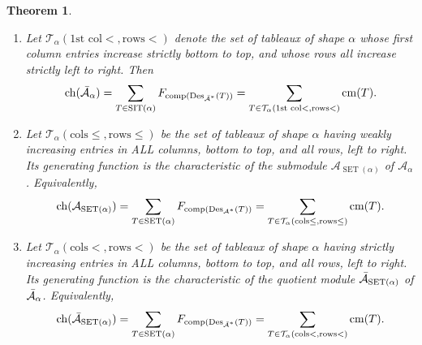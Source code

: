 \documentclass[12pt,letterpaper]{amsart}
\newcommand{\sheilaFeb}{\textcolor{black}}  \newcommand{\sheilaFebAgain}{\textcolor{magenta}}  \newcommand{\emn}{\textcolor{blue}}
\newtheorem{theorem}{Theorem}[section]
\theoremstyle{definition}
\DeclareMathOperator{\comp}{comp}
\DeclareMathOperator{\Des}{Des}
\newcommand{\SET}{\ensuremath{\operatorname{SET}}} \newcommand{\NSET}{\ensuremath{\operatorname{NSET}}}\newcommand{\SRCT}{\ensuremath{\operatorname{SRCT}}}
\begin{document}
{\begin{theorem}
\begin{enumerate}
\begin{equation*}\label{eqn:gf-A}
\sheilaFeb{\chr({\mathcal{A}_\alpha}) =\sum_{T\in \SIT(\alpha)} F_{\comp(\Des_{\mathcal{A}^*}(T))}=\sum_{T\in  \mathcal{T}_\alpha({\text{1st col}\le, \text{rows}\le})}  \mathrm{cm}(T)}.
\end{equation*}
\item Let $\mathcal{T}_\alpha({\text{1st col}<, \text{rows}<})$ denote the set of tableaux of shape $\alpha$ whose first column entries increase strictly bottom to top, and whose rows all increase strictly left to right. Then
\begin{equation*}\label{eqn:gf-barA}
\sheilaFeb{\chr(\bA_\alpha) =\sum_{T\in \SIT(\alpha)} F_{\comp(\Des_{\bA^*}(T))}=\sum_{T\in  \mathcal{T}_\alpha({\text{1st col}<, \text{rows}<})}  \mathrm{cm}(T)}.
\end{equation*}
\item Let $\mathcal{T}_\alpha({\text{cols}\le, \text{rows}\le})$ be the set of  tableaux of shape $\alpha$ having weakly increasing entries in ALL columns, bottom to top,  and all rows, left to right. Its generating function is the characteristic of the  submodule $\mathcal{A}_{\SET(\alpha)}$ of $\mathcal{A}_\alpha$. Equivalently,
\begin{equation*}\label{eqn:gf-A-SET}
\sheilaFeb{\chr(\mathcal{A}_{\SET(\alpha)})= \sum_{T\in \SET(\alpha)} F_{\comp(\Des_{\mathcal{A}^*}(T))}
=\sum_{T\in  \mathcal{T}_\alpha({\text{cols}\le, \text{rows}\le})}  \mathrm{cm}(T)}.
\end{equation*}
\item Let $\mathcal{T}_\alpha({\text{cols}<, \text{rows}<})$ be the set of  tableaux of shape $\alpha$ having strictly increasing entries in ALL columns, bottom to top,  and all rows, left to right.  Its generating function is the characteristic of the quotient module $\bA_{\SET(\alpha)}$ of $\operatorname{\bar{\mathcal{A}}}_\alpha$.  Equivalently,
\begin{equation*}\label{eqn:gf-barA-SET}
\sheilaFeb{\chr(\bA_{\SET(\alpha)})=\sum_{T\in \SET(\alpha)} F_{\comp(\Des_{\bA^*}(T))} =\sum_{T\in  \mathcal{T}_\alpha({\text{cols}<, \text{rows}<})}  \mathrm{cm}(T)}.
\end{equation*}
\end{enumerate}
\end{theorem}
}
\end{document}
